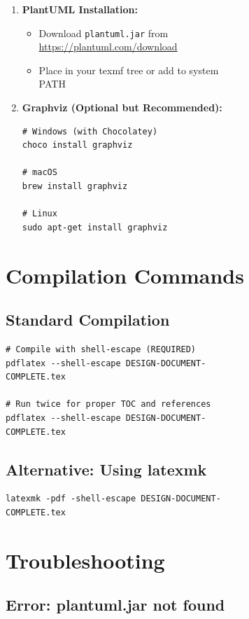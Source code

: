 \documentclass[12pt,a4paper]{report}
\begin{document}
\begin{figure}[H]
\begin{plantuml}
\begin{figure}[H]
\begin{plantuml}
\begin{enumerate}
    \item \textbf{PlantUML Installation:}
    \begin{itemize}
        \item Download \texttt{plantuml.jar} from \url{https://plantuml.com/download}
        \item Place in your texmf tree or add to system PATH
    \end{itemize}
    
    \item \textbf{Graphviz (Optional but Recommended):}
    \begin{lstlisting}[style=bashStyle]
# Windows (with Chocolatey)
choco install graphviz

# macOS
brew install graphviz

# Linux
sudo apt-get install graphviz
    \end{lstlisting}
\end{enumerate}

\section{Compilation Commands}

\subsection{Standard Compilation}

\begin{lstlisting}[style=bashStyle]
# Compile with shell-escape (REQUIRED)
pdflatex --shell-escape DESIGN-DOCUMENT-COMPLETE.tex

# Run twice for proper TOC and references
pdflatex --shell-escape DESIGN-DOCUMENT-COMPLETE.tex
\end{lstlisting}

\subsection{Alternative: Using latexmk}

\begin{lstlisting}[style=bashStyle]
latexmk -pdf -shell-escape DESIGN-DOCUMENT-COMPLETE.tex
\end{lstlisting}

\section{Troubleshooting}

\subsection{Error: plantuml.jar not found}


\end{plantuml}
\end{figure}
\end{plantuml}
\end{figure}
\end{document}
